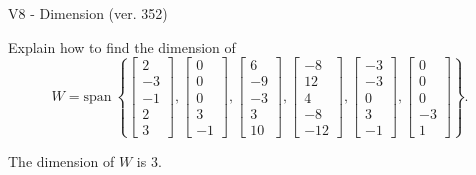 \begin{exercise}
  \begin{exerciseTitle}V8 - Dimension (ver. 352)\end{exerciseTitle}
  \begin{exerciseStatement}
    Explain how to find the dimension of 
\[W=\mathrm{span}\ \left\{\left[\begin{array}{r}
2 \\
-3 \\
-1 \\
2 \\
3
\end{array}\right] , \left[\begin{array}{r}
0 \\
0 \\
0 \\
3 \\
-1
\end{array}\right] , \left[\begin{array}{r}
6 \\
-9 \\
-3 \\
3 \\
10
\end{array}\right] , \left[\begin{array}{r}
-8 \\
12 \\
4 \\
-8 \\
-12
\end{array}\right] , \left[\begin{array}{r}
-3 \\
-3 \\
0 \\
3 \\
-1
\end{array}\right] , \left[\begin{array}{r}
0 \\
0 \\
0 \\
-3 \\
1
\end{array}\right]\right\}.\]



  \end{exerciseStatement}
  \begin{exerciseAnswer}
   The dimension of \(W\) is  \(3\).
  


  \end{exerciseAnswer}
\end{exercise}